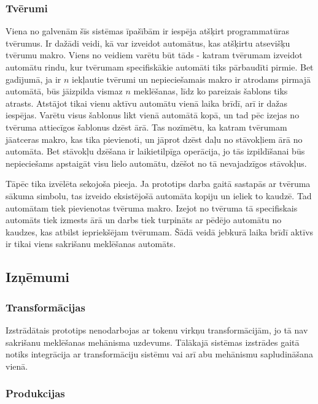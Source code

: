 \subsubsection{Tvērumi}

Viena no galvenām šīs sistēmas īpašībām ir iespēja atšķirt programmatūras tvērumus. Ir dažādi veidi, kā var izveidot automātus, kas atšķirtu atsevišķu tvērumu makro. Viens no veidiem varētu būt tāds - katram tvērumam izveidot automātu rindu, kur tvērumam specifiskākie automāti tiks pārbaudīti pirmie. Bet gadījumā, ja ir $n$ iekļautie tvērumi un nepieciešamais makro ir atrodams pirmajā automātā, būs jāizpilda vismaz $n$ meklēšanas, līdz ko pareizais šablons tiks atrasts. Atstājot tikai vienu aktīvu automātu vienā laika brīdī, arī ir dažas iespējas. Varētu visus šablonus likt vienā automātā kopā, un tad pēc izejas no tvēruma attiecīgos šablonus dzēst ārā. Tas nozīmētu, ka katram tvērumam jāatceras makro, kas tika pievienoti, un jāprot dzēst daļu no stāvokļiem ārā no automāta. Bet stāvokļu dzēšana ir laikietilpīga operācija, jo tās izpildīšanai būs nepieciešams apstaigāt visu lielo automātu, dzēšot no tā nevajadzīgos stāvokļus.

Tāpēc tika izvēlēta sekojoša pieeja. Ja prototips darba gaitā sastapās ar tvēruma sākuma simbolu, tas izveido eksistējošā automāta kopiju un ieliek to kaudzē. Tad automātam tiek pievienotas tvēruma makro. Izejot no tvēruma tā specifiskais automāts tiek izmests ārā un darbs tiek turpināts ar pēdējo automātu no kaudzes, kas atbilst iepriekšējam tvērumam. Šādā veidā jebkurā laika brīdī aktīvs ir tikai viens sakrišanu meklēšanas automāts.

\subsection{\label{sbs:sol_problems}Izņēmumi}

\subsubsection{Transformācijas}

Izstrādātais prototips nenodarbojas ar tokenu virkņu transformācijām, jo tā nav sakrišanu meklēšanas mehānisma uzdevums. Tālākajā sistēmas izstrādes gaitā notiks integrācija ar transformāciju sistēmu vai arī abu mehānismu sapludināšana vienā.

\subsubsection{Produkcijas}

